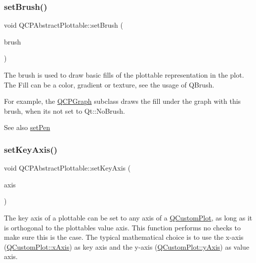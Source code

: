 \subsubsection{\texorpdfstring{set\+Brush()}{setBrush()}}
{\footnotesize\ttfamily void Q\+C\+P\+Abstract\+Plottable\+::set\+Brush (\begin{DoxyParamCaption}\item[{const Q\+Brush \&}]{brush }\end{DoxyParamCaption})}

The brush is used to draw basic fills of the plottable representation in the plot. The Fill can be a color, gradient or texture, see the usage of Q\+Brush.

For example, the \mbox{\hyperlink{class_q_c_p_graph}{Q\+C\+P\+Graph}} subclass draws the fill under the graph with this brush, when it\textquotesingle{}s not set to Qt\+::\+No\+Brush.

\begin{DoxySeeAlso}{See also}
\mbox{\hyperlink{class_q_c_p_abstract_plottable_ab74b09ae4c0e7e13142fe4b5bf46cac7}{set\+Pen}} 
\end{DoxySeeAlso}
\mbox{\label{class_q_c_p_abstract_plottable_a8524fa2994c63c0913ebd9bb2ffa3920}} 
\subsubsection{\texorpdfstring{set\+Key\+Axis()}{setKeyAxis()}}
{\footnotesize\ttfamily void Q\+C\+P\+Abstract\+Plottable\+::set\+Key\+Axis (\begin{DoxyParamCaption}\item[{\mbox{\hyperlink{class_q_c_p_axis}{Q\+C\+P\+Axis}} $\ast$}]{axis }\end{DoxyParamCaption})}

The key axis of a plottable can be set to any axis of a \mbox{\hyperlink{class_q_custom_plot}{Q\+Custom\+Plot}}, as long as it is orthogonal to the plottable\textquotesingle{}s value axis. This function performs no checks to make sure this is the case. The typical mathematical choice is to use the x-\/axis (\mbox{\hyperlink{class_q_custom_plot_a9a79cd0158a4c7f30cbc702f0fd800e4}{Q\+Custom\+Plot\+::x\+Axis}}) as key axis and the y-\/axis (\mbox{\hyperlink{class_q_custom_plot_af6fea5679725b152c14facd920b19367}{Q\+Custom\+Plot\+::y\+Axis}}) as value axis.

